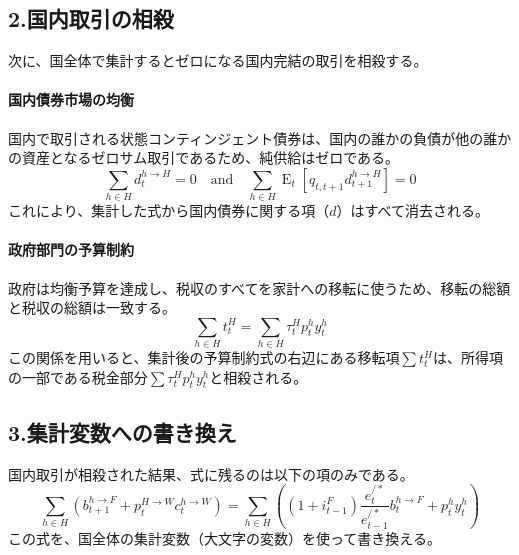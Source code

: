\subsection*{2.国内取引の相殺}
\label{sec:appendix_resource_constraint_sub2}
次に、国全体で集計するとゼロになる国内完結の取引を相殺する。

\paragraph{国内債券市場の均衡}
\label{sec:appendix_resource_constraint_sub2_bond}
国内で取引される状態コンティンジェント債券は、国内の誰かの負債が他の誰かの資産となるゼロサム取引であるため、純供給はゼロである。
\begin{equation}
\label{form:appendix_resource_constraint_sub2_bond_clearing}
\sum_{h\in H}d_t^{h\to H}=0\quad\text{and}\quad\sum_{h\in H}\operatorname{E}_t[q_{t,t+1}d_{t+1}^{h\to H}]=0
\end{equation}
これにより、集計した式から国内債券に関する項（\(d\)）はすべて消去される。

\paragraph{政府部門の予算制約}
\label{sec:appendix_resource_constraint_sub2_gov}
政府は均衡予算を達成し、税収のすべてを家計への移転に使うため、移転の総額と税収の総額は一致する。
\begin{equation}
\label{form:appendix_resource_constraint_sub2_gov_budget}
\sum_{h\in H}t_t^H=\sum_{h\in H}\tau_t^Hp_t^hy_t^h
\end{equation}
この関係を用いると、集計後の予算制約式の右辺にある移転項\(\sum t_t^H\)は、所得項の一部である税金部分\(\sum\tau_t^Hp_t^hy_t^h\)と相殺される。

\subsection*{3.集計変数への書き換え}
\label{sec:appendix_resource_constraint_sub3}
国内取引が相殺された結果、式に残るのは以下の項のみである。
\begin{equation}
\label{form:appendix_resource_constraint_sub3_remaining_terms}
\sum_{h\in H}\left(b_{t+1}^{h\to F}+p_t^{H\to W}c_t^{h\to W}\right)=\sum_{h\in H}\left((1+i_{t-1}^F)\frac{e_t^{/*}}{e_{t-1}^{/*}}b_t^{h\to F}+p_t^hy_t^h\right)
\end{equation}
この式を、国全体の集計変数（大文字の変数）を使って書き換える。

